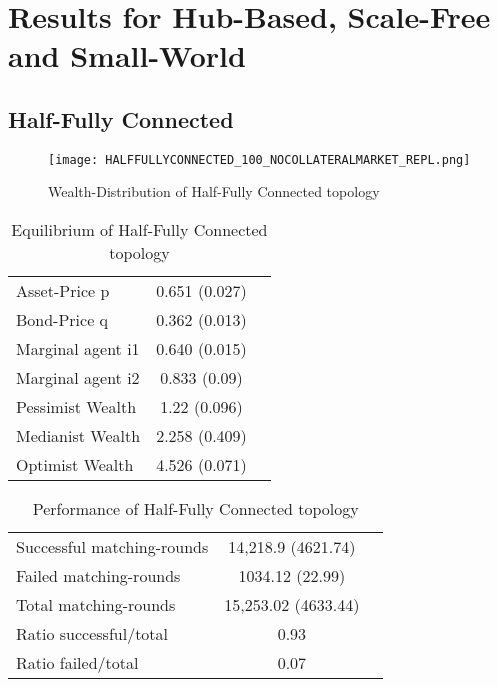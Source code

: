 \documentclass[Bachelorarbeit.tex]{subfiles}
\begin{document}
\graphicspath{{./figures/appendixResults/}}	%

\chapter{Results for Hub-Based, Scale-Free and Small-World}
\label{app:results}

\section{Half-Fully Connected}
\begin{figure}[H]
	\centering
  \texttt{[image: HALFFULLYCONNECTED\_100\_NOCOLLATERALMARKET\_REPL.png]}
	\caption{Wealth-Distribution of Half-Fully Connected topology }
	\label{fig:wealth_HALFFULLYCONNECTED_100_NOCOLLATERALMARKET_REPL}
\end{figure}

\begin{table}[H]
	\caption{Equilibrium of Half-Fully Connected topology}
	\centering
	\begin{tabular} { l c r }
		\hline
		Asset-Price p & 0.651 (0.027) \\
		Bond-Price q & 0.362 (0.013) \\
		Marginal agent i1 & 0.640 (0.015) \\
		Marginal agent i2 & 0.833 (0.09) \\
		\hline
		Pessimist Wealth & 1.22 (0.096) \\
		Medianist Wealth & 2.258 (0.409) \\
		Optimist Wealth & 4.526 (0.071) \\
		\hline
	\end{tabular}
\end{table} 

\begin{table}[H]
	\caption{Performance of Half-Fully Connected topology}
	\centering
	\begin{tabular} { l c r }
		\hline
		Successful matching-rounds& 14,218.9 (4621.74) \\
		Failed matching-rounds & 1034.12 (22.99) \\
		Total matching-rounds & 15,253.02 (4633.44) \\
		\hline
		Ratio successful/total & 0.93 \\
		Ratio failed/total & 0.07 \\
		\hline
	\end{tabular}
\end{table}
\end{document}
